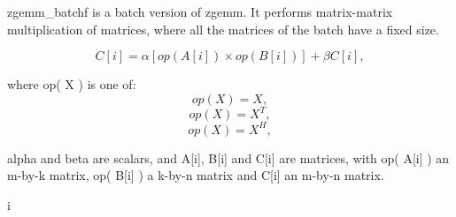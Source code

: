 zgemm\+\_\+batchf is a batch version of zgemm. It performs matrix-\/matrix multiplication of matrices, where all the matrices of the batch have a fixed size.

\[ C[i] = \alpha [op( A[i] )\times op( B[i] )] + \beta C[i], \]

where op( X ) is one of\+: \[ op( X ) = X, \] \[ op( X ) = X^T, \] \[ op( X ) = X^H, \]

alpha and beta are scalars, and A\mbox{[}i\mbox{]}, B\mbox{[}i\mbox{]} and C\mbox{[}i\mbox{]} are matrices, with op( A\mbox{[}i\mbox{]} ) an m-\/by-\/k matrix, op( B\mbox{[}i\mbox{]} ) a k-\/by-\/n matrix and C\mbox{[}i\mbox{]} an m-\/by-\/n matrix. \begin{DoxyVerb}                                                                        i
\end{DoxyVerb}
 
